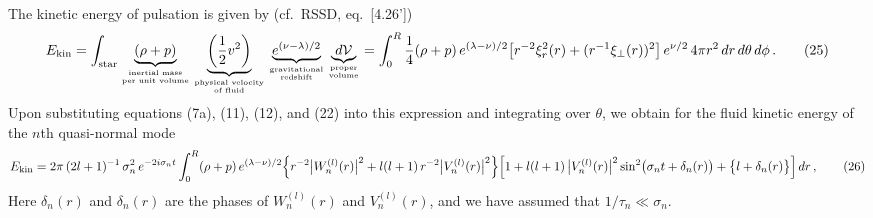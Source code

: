 \documentclass[12pt]{article}
\begin{document}
The kinetic energy of pulsation is given by (cf.\ RSSD, eq.\ [4.26'])
%
\begin{equation}
E_{\rm kin} = \int_{\rm star}
\underbrace{\left(\rho + p\right)}_{\text{inertial mass}\atop\text{per unit volume}}
\underbrace{\left(\frac{1}{2}v^2\right)}_{\text{physical velocity}\atop\text{of fluid}}
\underbrace{e^{(\nu - \lambda)/2}}_{\text{gravitational}\atop\text{redshift}}
\underbrace{d\mathcal{V}}_{\text{proper}\atop\text{volume}}
= \int_0^R \frac{1}{4}(\rho+p)\,e^{(\lambda-\nu)/2}\bigl[r^{-2}\xi_r^2(r) + (r^{-1}\xi_\perp(r))^2\bigr]\,e^{\nu/2}\,4\pi r^2\,dr\,d\theta\,d\phi \,.
\tag{25}
\end{equation}
%
Upon substituting equations (7a), (11), (12), and (22) into this expression and
integrating over $\theta$, we obtain for the fluid kinetic energy of the $n$th quasi-normal mode
%
\begin{equation}
E_{\rm kin} = 2\pi\,(2l+1)^{-1}\,\sigma_n^2\,e^{-2i\sigma_n t}
\int_0^R (\rho+p)\,e^{(\lambda-\nu)/2}
\Bigl\{
r^{-2}\bigl|W_n^{(l)}(r)\bigr|^2
+ l(l+1)\,r^{-2}\bigl|V_n^{(l)}(r)\bigr|^2
\Bigr\}
\Bigl[
1 + l(l+1)\,\bigl|V_n^{(l)}(r)\bigr|^2
\sin^2\bigl(\sigma_n t + \delta_n(r)\bigr)
+ \bigl\{l + \delta_n(r)\bigr\}
\Bigr]\,dr \,,
\tag{26}
\end{equation}
%
Here $\delta_n(r)$ and $\delta_n(r)$ are the phases of $W_n^{(l)}(r)$ and $V_n^{(l)}(r)$, and we have assumed that
$1/\tau_n \ll \sigma_n$.
\end{document}
